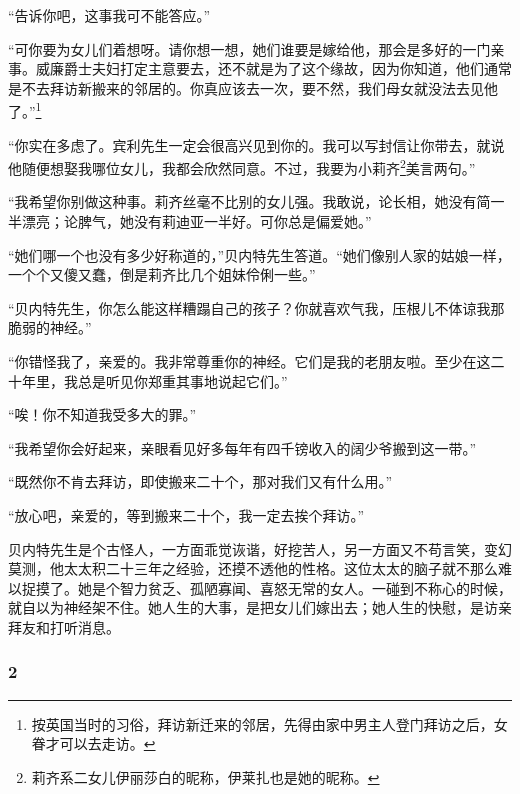 \par “告诉你吧，这事我可不能答应。”
\par “可你要为女儿们着想呀。请你想一想，她们谁要是嫁给他，那会是多好的一门亲事。威廉爵士夫妇打定主意要去，还不就是为了这个缘故，因为你知道，他们通常是不去拜访新搬来的邻居的。你真应该去一次，要不然，我们母女就没法去见他了。”\footnote{按英国当时的习俗，拜访新迁来的邻居，先得由家中男主人登门拜访之后，女眷才可以去走访。}
\par “你实在多虑了。宾利先生一定会很高兴见到你的。我可以写封信让你带去，就说他随便想娶我哪位女儿，我都会欣然同意。不过，我要为小莉齐\footnote{莉齐系二女儿伊丽莎白的昵称，伊莱扎也是她的昵称。}美言两句。”
\par “我希望你别做这种事。莉齐丝毫不比别的女儿强。我敢说，论长相，她没有简一半漂亮；论脾气，她没有莉迪亚一半好。可你总是偏爱她。”
\par “她们哪一个也没有多少好称道的，”贝内特先生答道。“她们像别人家的姑娘一样，一个个又傻又蠢，倒是莉齐比几个姐妹伶俐一些。”
\par “贝内特先生，你怎么能这样糟蹋自己的孩子？你就喜欢气我，压根儿不体谅我那脆弱的神经。”
\par “你错怪我了，亲爱的。我非常尊重你的神经。它们是我的老朋友啦。至少在这二十年里，我总是听见你郑重其事地说起它们。”
\par “唉！你不知道我受多大的罪。”
\par “我希望你会好起来，亲眼看见好多每年有四千镑收入的阔少爷搬到这一带。”
\par “既然你不肯去拜访，即使搬来二十个，那对我们又有什么用。”
\par “放心吧，亲爱的，等到搬来二十个，我一定去挨个拜访。”
\par 贝内特先生是个古怪人，一方面乖觉诙谐，好挖苦人，另一方面又不苟言笑，变幻莫测，他太太积二十三年之经验，还摸不透他的性格。这位太太的脑子就不那么难以捉摸了。她是个智力贫乏、孤陋寡闻、喜怒无常的女人。一碰到不称心的时候，就自以为神经架不住。她人生的大事，是把女儿们嫁出去；她人生的快慰，是访亲拜友和打听消息。



\subsubsection*{2}

